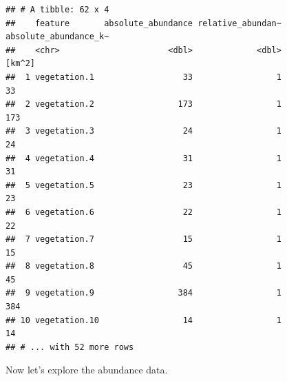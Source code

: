 \documentclass[12pt,]{book}
\newenvironment{Shaded}{\begin{snugshade}}{\end{snugshade}}
\newcommand{\KeywordTok}[1]{\textcolor[rgb]{0.13,0.29,0.53}{\textbf{#1}}}
\newcommand{\DecValTok}[1]{\textcolor[rgb]{0.00,0.00,0.81}{#1}}
\newcommand{\StringTok}[1]{\textcolor[rgb]{0.31,0.60,0.02}{#1}}
\newcommand{\CommentTok}[1]{\textcolor[rgb]{0.56,0.35,0.01}{\textit{#1}}}
\newcommand{\OperatorTok}[1]{\textcolor[rgb]{0.81,0.36,0.00}{\textbf{#1}}}
\newcommand{\NormalTok}[1]{#1}
\begin{document}
\begin{Shaded}
\end{Shaded}

\begin{verbatim}
## # A tibble: 62 x 4
##    feature       absolute_abundance relative_abundan~ absolute_abundance_k~
##    <chr>                      <dbl>             <dbl>                [km^2]
##  1 vegetation.1                  33                 1                    33
##  2 vegetation.2                 173                 1                   173
##  3 vegetation.3                  24                 1                    24
##  4 vegetation.4                  31                 1                    31
##  5 vegetation.5                  23                 1                    23
##  6 vegetation.6                  22                 1                    22
##  7 vegetation.7                  15                 1                    15
##  8 vegetation.8                  45                 1                    45
##  9 vegetation.9                 384                 1                   384
## 10 vegetation.10                 14                 1                    14
## # ... with 52 more rows
\end{verbatim}

Now let's explore the abundance data.

\begin{Shaded}
\end{Shaded}
\end{document}
